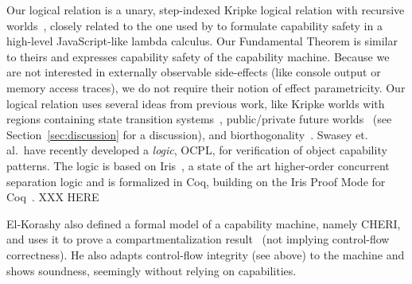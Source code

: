 \documentclass[acmsmall,review]{acmart}\settopmatter{printfolios=true}
\begin{document}
Our logical relation is a unary, step-indexed Kripke logical relation
with recursive
worlds~\citep{Appel:2001:IMR:504709.504712,Ahmed2004semantics,Birkedal:2011:SKM:1926385.1926401},
closely related to the one used by \citet{Devriese:2016ObjCap} to formulate
capability safety in a high-level JavaScript-like lambda calculus. Our
Fundamental Theorem is similar to theirs and expresses
capability safety of the capability machine. Because we are not interested in
externally observable side-effects (like console output or memory access
traces), we do not require their notion of effect parametricity. Our logical
relation uses several ideas from previous work, like Kripke worlds with regions
containing state transition systems~\citep{Ahmed:popl09}, public/private future
worlds~\citep{Dreyer:jfp12} (see Section~\ref{sec:discussion} for a discussion), and
biorthogonality~\citep{pitts_operational_1998,benton_biorthogonality_2009-1,Hur:2011:KLR:1926385.1926402}.
Swasey et. al.\ have recently developed a \emph{logic}, OCPL,  for verification of
object capability patterns\citep{swasey:2017}. The logic is based on
Iris~\citep{iris,iris2,iris3}, a state of the art higher-order
concurrent separation logic and is formalized in Coq, building on the
Iris Proof Mode for Coq~\citep{ipm}.  
XXX HERE



El-Korashy also defined a formal model of a capability machine, namely CHERI,
and uses it to prove a compartmentalization
result~\citep{akram_el-korashy_formal_2016} (not implying control-flow
correctness). He also adapts control-flow integrity (see above) to the machine
and shows soundness, seemingly without relying on capabilities.








\end{document}
